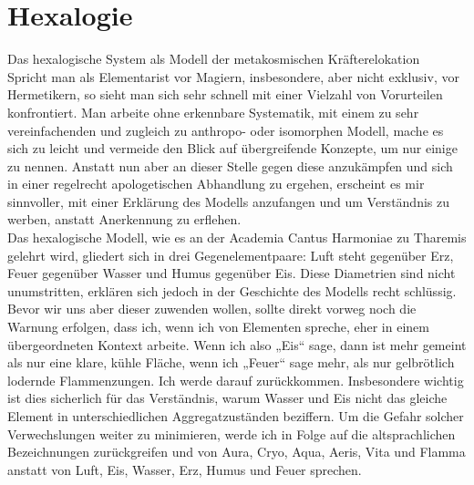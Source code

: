 \documentclass[a5paper,8pt]{book}
\begin{document}
\newpage

\section{Hexalogie}

Das hexalogische System als Modell der metakosmischen Kräfterelokation\\

Spricht man als Elementarist vor Magiern, insbesondere, aber nicht exklusiv, vor Hermetikern, so sieht man sich sehr schnell mit einer Vielzahl von Vorurteilen konfrontiert. 
Man arbeite ohne erkennbare Systematik, mit einem zu sehr vereinfachenden und zugleich zu anthropo- oder isomorphen Modell, mache es sich zu leicht und vermeide den Blick auf 
übergreifende Konzepte, um nur einige zu nennen.
Anstatt nun aber an dieser Stelle gegen diese anzukämpfen und sich in einer regelrecht apologetischen Abhandlung zu ergehen, erscheint es mir sinnvoller, mit einer Erklärung 
des Modells anzufangen und um Verständnis zu werben, anstatt Anerkennung zu erflehen.\\

Das hexalogische Modell, wie es an der Academia Cantus Harmoniae zu Tharemis gelehrt wird, gliedert sich in drei Gegenelementpaare: Luft steht gegenüber Erz, Feuer gegenüber 
Wasser und Humus gegenüber Eis. Diese Diametrien sind nicht unumstritten, erklären sich jedoch in der Geschichte des Modells recht schlüssig.
Bevor wir uns aber dieser zuwenden wollen, sollte direkt vorweg noch die Warnung erfolgen, dass ich, wenn ich von Elementen spreche, eher in einem übergeordneten Kontext 
arbeite. Wenn ich also „Eis“ sage, dann ist mehr gemeint als nur eine klare, kühle Fläche, wenn ich „Feuer“ sage mehr, als nur gelbrötlich lodernde Flammenzungen. Ich werde 
darauf zurückkommen. Insbesondere wichtig ist dies sicherlich für das Verständnis, warum Wasser und Eis nicht das gleiche Element in unterschiedlichen Aggregatzuständen 
beziffern.
Um die Gefahr solcher Verwechslungen weiter zu minimieren, werde ich in Folge auf die altsprachlichen Bezeichnungen zurückgreifen und von Aura, Cryo, Aqua, Aeris, Vita und 
Flamma anstatt von Luft, Eis, Wasser, Erz, Humus und Feuer sprechen.\\
\end{document}
